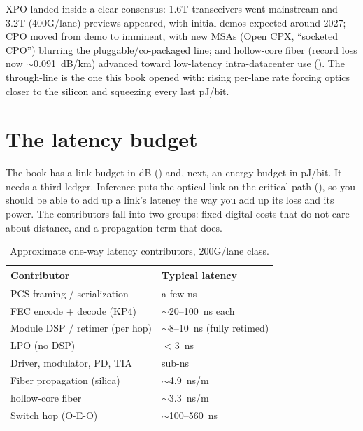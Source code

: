 
 XPO landed inside a clear consensus: 1.6T
transceivers went mainstream and 3.2T (400G/lane) previews appeared, with initial
demos expected around 2027; CPO moved from demo to imminent, with new MSAs (Open
CPX, ``socketed CPO'') blurring the pluggable/co-packaged line; and hollow-core
fiber (record loss now $\sim$0.091~dB/km) advanced toward low-latency
intra-datacenter use ().
The through-line is the one this book opened with: rising per-lane rate forcing
optics closer to the silicon and squeezing every last pJ/bit.

\section{The latency budget}
\label{sec:latency-budget}

The book has a link budget in dB () and, next, an energy
budget in pJ/bit. It needs a third ledger. Inference puts the optical link on the
critical path (), so you should be able to add up a
link's latency the way you add up its loss and its power. The contributors fall
into two groups: fixed digital costs that do not care about distance, and a
propagation term that does.

\begin{table}[ht]
\centering
\caption{Approximate one-way latency contributors, 200G/lane class.\label{tab:latency}}
\renewcommand{\arraystretch}{1.25}%
\begin{tabular}{@{}ll@{}}
\toprule
Contributor & Typical latency \\
\midrule
PCS framing / serialization & a few ns \\
\addlinespace[1.5em]
FEC encode $+$ decode (KP4) & $\sim$20--100~ns each \\
\addlinespace[1.5em]
Module DSP / retimer (per hop) & $\sim$8--10~ns (fully retimed) \\
\addlinespace[1.5em]
\quad LPO (no DSP) & $<$3~ns \\
\addlinespace[1.5em]
Driver, modulator, PD, TIA & sub-ns \\
\addlinespace[1.5em]
Fiber propagation (silica) & $\sim$4.9~ns/m \\
\addlinespace[1.5em]
\quad hollow-core fiber & $\sim$3.3~ns/m \\
\addlinespace[1.5em]
Switch hop (O-E-O) & $\sim$100--560~ns \\
\bottomrule
\end{tabular}
\end{table}

